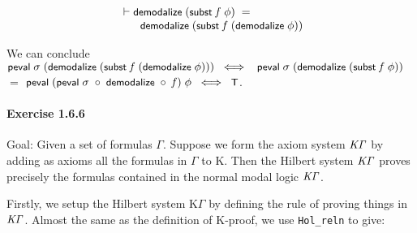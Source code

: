 \documentclass[letterpaper]{article}
\renewcommand{\HOLConst}[1]{{\textsf{\upshape\small #1}}}
\renewcommand{\HOLinline}[1]{\ensuremath{#1}}
\newenvironment{holmath}{\begin{displaymath}\begin{array}{l}}{\end{array}\end{displaymath}\ignorespacesafterend}
\begin{document}
\begin{holmath}
  \ensuremath{\HOLTokenTurnstile}\HOLConst{demodalize}\;(\HOLConst{subst}\;\HOLFreeVar{f}\;\HOLFreeVar{\ensuremath{\phi}})\;\HOLSymConst{=}\\
\;\;\;\;\;\;\;\HOLConst{demodalize}\;(\HOLConst{subst}\;\HOLFreeVar{f}\;(\HOLConst{demodalize}\;\HOLFreeVar{\ensuremath{\phi}}))
\end{holmath}

We can conclude \HOLinline{\HOLConst{peval}\;\HOLFreeVar{\ensuremath{\sigma}}\;(\HOLConst{demodalize}\;(\HOLConst{subst}\;\HOLFreeVar{f}\;(\HOLConst{demodalize}\;\HOLFreeVar{\ensuremath{\phi}})))\;\HOLSymConst{\HOLTokenEquiv{}}\\
\;\;\HOLConst{peval}\;\HOLFreeVar{\ensuremath{\sigma}}\;(\HOLConst{demodalize}\;(\HOLConst{subst}\;\HOLFreeVar{f}\;\HOLFreeVar{\ensuremath{\phi}}))} $=$ \HOLinline{\HOLConst{peval}\;(\HOLConst{peval}\;\HOLFreeVar{\ensuremath{\sigma}}\;\HOLSymConst{\HOLTokenCompose}\;\HOLConst{demodalize}\;\HOLSymConst{\HOLTokenCompose}\;\HOLFreeVar{f})\;\HOLFreeVar{\ensuremath{\phi}}\;\HOLSymConst{\HOLTokenEquiv{}}\;\HOLConst{T}}.

  
\paragraph{Exercise 1.6.6}

Goal: Given a set of formulas $\Gamma$. Suppose we form the axiom system \HOLinline{\HOLFreeVar{K\ensuremath{\Gamma}}} by adding as axioms all the formulas in $\Gamma$ to K. Then the Hilbert system \HOLinline{\HOLFreeVar{K\ensuremath{\Gamma}}} proves precisely the formulas contained in the normal modal logic \HOLinline{\HOLFreeVar{K\ensuremath{\Gamma}}}.

Firstly, we setup the Hilbert system K$\Gamma$ by defining the rule of proving things in \HOLinline{\HOLFreeVar{K\ensuremath{\Gamma}}}. Almost the same as the definition of K-proof, we use \texttt{Hol_reln} to give:
\end{document}
